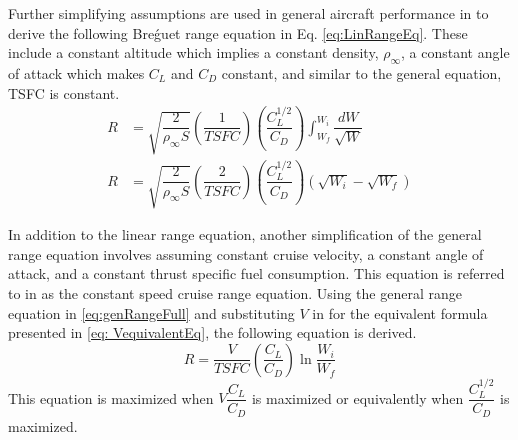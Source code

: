 Further simplifying assumptions are used in general aircraft performance in \cite{IntroACMechanics} to derive the following Bre\'guet range equation in Eq. \ref{eq:LinRangeEq}. These include a constant altitude which implies a constant density, $\rho_{\infty}$, a constant angle of attack which makes $C_L$ and $C_D$ constant, and similar to the general equation, TSFC is constant.
\begin{equation}
\label{eq:LinRangeEq}
    \begin{aligned}
        R &= \sqrt{\dfrac{2}{\rho_{\infty}S}}\left(\dfrac{1}{TSFC}\right)\left(\dfrac{C_L^{1/2}}{C_D}\right)\int_{W_f}^{W_i}\dfrac{dW}{\sqrt{W}}\\
        R &= \sqrt{\dfrac{2}{\rho_{\infty}S}}\left(\dfrac{2}{TSFC}\right)\left(\dfrac{C_L^{1/2}}{C_D}\right)(\sqrt{W_i}-\sqrt{W_f})
    \end{aligned}
\end{equation} \par
In addition to the linear range equation, another simplification of the general range equation involves assuming constant cruise velocity, a constant angle of attack, and a constant thrust specific fuel consumption. This equation is referred to in \cite{IntroACMechanics} as the constant speed cruise range equation. Using the general range equation in \ref{eq:genRangeFull} and substituting $V$ in for the equivalent formula presented in \ref{eq: VequivalentEq}, the following equation is derived.
\begin{equation}
    R = \dfrac{V}{TSFC}\left(\dfrac{C_L}{C_D}\right)\ln{\dfrac{W_i}{W_f}}
    \label{eq: NLRange}
\end{equation}
This equation is maximized when $V\dfrac{C_L}{C_D}$ is maximized or equivalently when $\dfrac{C_L^{1/2}}{C_D}$ is maximized.


